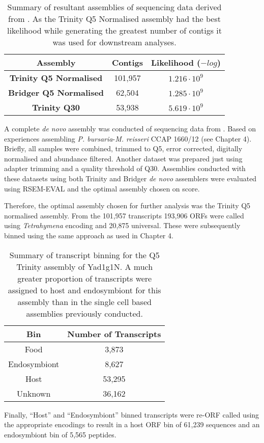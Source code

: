 \begin{table}
    \centering
    \begin{tabular}{|c|c|c|}
        \hline
        \textbf{Assembly} & \textbf{Contigs} & \textbf{Likelihood (\(-log\))}\\
        \hline
        \textbf{Trinity Q5 Normalised}  & 101,957 & \(1.216\cdot10^9\)\\
        \textbf{Bridger Q5 Normalised} & 62,504 & \(1.285\cdot10^9\)\\
        \textbf{Trinity Q30} & 53,938  & \(5.619\cdot10^{9} \) \\
        \hline
    \end{tabular}
    \caption[Summary of Yad1g1N Transcriptome Assemblies]{Summary of resultant 
    assemblies of sequencing data derived from \citep{Kodama2014c}.  As the
Trinity Q5 Normalised assembly had the best likelihood while generating
the greatest number of contigs it was used for downstream analyses.}
    \label{tab:kodama_assembly}
\end{table}

A complete \textit{de novo} assembly was conducted of sequencing data
from \citep{Kodama2014c}.  Based on experiences assembling
\textit{P. bursaria}-\textit{M. reisseri} CCAP 1660/12 (see Chapter 4).
Briefly, all samples were combined, trimmed to Q5, 
error corrected, digitally normalised and abundance filtered.  Another dataset
was prepared just using adapter trimming and a quality threshold of Q30.
Assemblies conducted with these datasets using both Trinity and Bridger
\textit{de novo} assemblers were evaluated using RSEM-EVAL and the optimal
assembly chosen on score. 

Therefore, the optimal assembly chosen for further analysis was the Trinity
Q5 normalised assembly.
From the 101,957 transcripts 193,906 ORFs were called using \textit{Tetrahymena}
encoding and 20,875 universal.
These were subsequently binned using the same approach as used in 
Chapter 4.

\begin{table}
    \centering
    \begin{tabular}{|c|c|}
        \hline
        \textbf{Bin} & \textbf{Number of Transcripts} \\
        \hline
        Food & 3,873 \\
        Endosymbiont & 8,627 \\
        Host & 53,295 \\
        Unknown & 36,162 \\
        \hline
    \end{tabular}
    \caption[Yad1g1N Transcript Binning Summary]{Summary of transcript
        binning for the Q5 Trinity assembly of Yad1g1N.  
        A much greater proportion of transcripts were assigned
        to host and endosymbiont for this assembly than in the single cell
    based assemblies previously conducted.}
\end{table}
Finally, ``Host'' and ``Endosymbiont'' binned transcripts 
were re-ORF called using the appropriate encodings to result in a 
host ORF bin of 61,239 sequences
and an endosymbiont bin of 5,565 peptides. 

